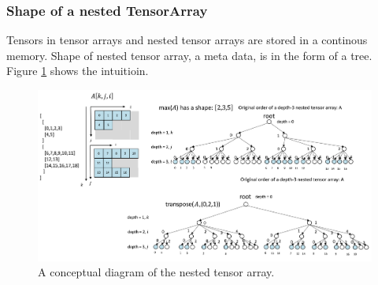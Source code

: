 \subsubsection{Shape of a nested TensorArray}

Tensors in tensor arrays and nested tensor arrays are stored in a continous memory. Shape of nested tensor array, a meta data, is in the form of a tree. Figure \ref{nested_ta} shows the intuitioin.

\begin{figure}[htbp]
\centering
\includegraphics[width=1.\textwidth]{images/nested_tensorarray.png}
\caption{A conceptual diagram of the nested tensor array.}
\label{nested_ta}
\end{figure}
